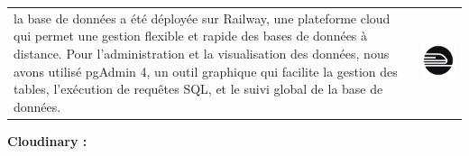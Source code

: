 \documentclass{article}
\begin{document}
\noindent
\begin{tabular}
{@{}m{}@{\hspace{1em}}m{}@{}}

la base de données a été déployée sur Railway, une plateforme cloud qui permet une gestion flexible et rapide des bases de données à distance.
Pour l’administration et la visualisation des données, nous avons utilisé pgAdmin 4, un outil graphique qui facilite la gestion des tables, l’exécution de requêtes SQL, et le suivi global de la base de données.
&
\includegraphics[width=\linewidth]{railway.png} %
\end{tabular}

\vspace{0,8cm}

\noindent \large \textbf {Cloudinary \cite{cloudinary}:}
\end{document}
